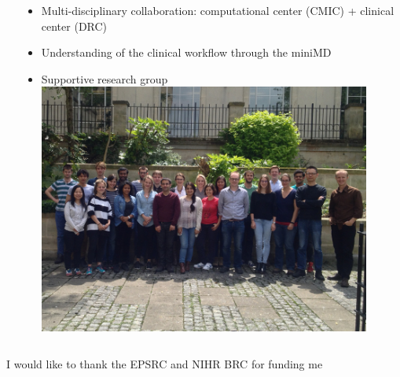 \documentclass[10pt,xcolor=table]{beamer}
\begin{document}
\begin{frame}
\begin{small}
\begin{columns}[T]
\begin{column}{.47\textwidth}
\begin{itemize}
  \vspace{1em}
  
 \end{itemize}

    
    \end{column}
    
    
    \begin{column}{.47\textwidth}
    
    \begin{itemize}
    \item Multi-disciplinary collaboration: computational center (CMIC) + clinical center (DRC)
    
    \item Understanding of the clinical workflow through the miniMD
    
    \item Supportive research group
    \includegraphics[width=0.9\textwidth,trim=0 40 0 40, clip]{MIGPOND}
    
  \end{itemize}
 
    \vspace{-2em}

    
\end{column}
\end{columns}

\vspace{1em}

I would like to thank the EPSRC and NIHR BRC for funding me


\end{small}
\end{frame}
\end{document}
